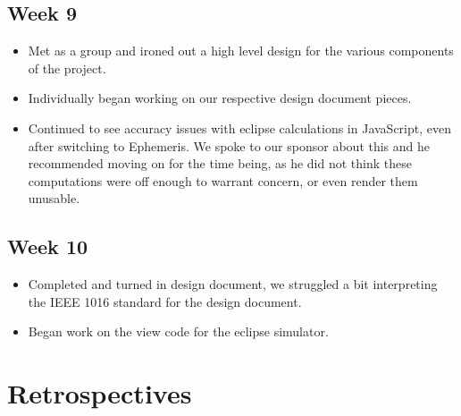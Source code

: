 \documentclass[10pt, onecolumn, draftclsnofoot, letterpaper, compsoc]{IEEEtran}
\begin{document}
\subsection{Week 9}

    \begin{itemize}

    \item Met as a group and ironed out a high level design for the various 
    components of the project. 

    \item Individually began working on our respective design document pieces.

    \item Continued to see accuracy issues with eclipse calculations in 
    JavaScript, even after switching to Ephemeris. We spoke to our sponsor about 
    this and he recommended moving on for the time being, as he did not think 
    these computations were off enough to warrant concern, or even render them 
    unusable.

    \end{itemize}

\subsection{Week 10}

    \begin{itemize}

    \item Completed and turned in design document, we struggled a bit 
    interpreting the IEEE 1016 standard for the design document.

    \item Began work on the view code for the eclipse simulator.

    \end{itemize}

\section{Retrospectives}
\end{document}
